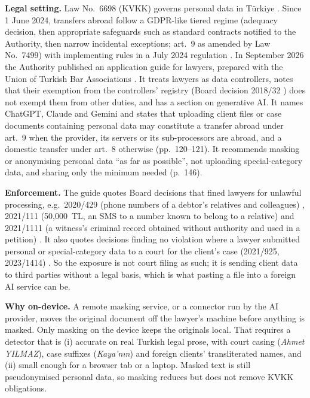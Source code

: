 \documentclass[10pt,twocolumn]{article}
\begin{document}
\textbf{Legal setting.} Law No.~6698 (KVKK) governs personal data in T{\"u}rkiye \citep{kvkk6698}. Since 1 June
2024, transfers abroad follow a GDPR-like tiered regime (adequacy decision, then appropriate safeguards such as
standard contracts notified to the Authority, then narrow incidental exceptions; art.~9 as amended by Law
No.~7499) with implementing rules in a July 2024 regulation \citep{kvkk-transfer-reg}. In September 2026 the
Authority published an application guide for lawyers, prepared with the Union of Turkish Bar Associations
\citep{kvkk-lawyers-guide}. It treats lawyers as data controllers, notes that their exemption from the
controllers' registry (Board decision 2018/32 \citep{kvkk-2018-32}) does not exempt them from other duties, and
has a section on generative AI. It names ChatGPT, Claude and Gemini and states that uploading client files or
case documents containing personal data may constitute a transfer abroad under art.~9 when the provider, its
servers or its sub-processors are abroad, and a domestic transfer under art.~8 otherwise (pp.~120--121). It
recommends masking or anonymising personal data ``as far as possible'', not uploading special-category data,
and sharing only the minimum needed (p.~146).

\textbf{Enforcement.} The guide quotes Board decisions that fined lawyers for unlawful processing, e.g.\ 2020/429
(phone numbers of a debtor's relatives and colleagues) \citep{kvkk-2020-429}, 2021/111 (50,000~TL, an SMS to a
number known to belong to a relative) \citep{kvkk-2021-111} and 2021/1111 (a witness's criminal record obtained
without authority and used in a petition) \citep{kvkk-2021-1111}. It also quotes decisions finding no violation
where a lawyer submitted personal or special-category data to a court for the client's case (2021/925, 2023/1414)
\citep{kvkk-2021-925,kvkk-2023-1414}. So the exposure is not court filing as such; it is sending client data to
third parties without a legal basis, which is what pasting a file into a foreign AI service can be.

\textbf{Why on-device.} A remote masking service, or a connector run by the AI provider, moves the original
document off the lawyer's machine before anything is masked. Only masking on the device keeps the originals
local. That requires a detector that is (i) accurate on real Turkish legal prose, with court casing
(\emph{Ahmet YILMAZ}), case suffixes (\emph{Kaya'n{\i}n}) and foreign clients' transliterated names, and
(ii) small enough for a browser tab or a laptop. Masked text is still pseudonymised personal data, so masking
reduces but does not remove KVKK obligations.
\end{document}

